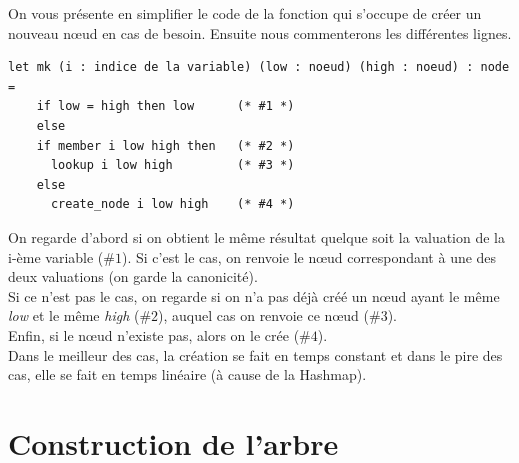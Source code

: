 \documentclass[a4paper, oneside]{report}
\begin{document}
On vous présente en simplifier le code de la fonction qui s'occupe de créer un nouveau nœud en cas de besoin. Ensuite nous commenterons les différentes lignes.
\begin{lstlisting}
let mk (i : indice de la variable) (low : noeud) (high : noeud) : node =
    if low = high then low      (* #1 *)
    else
    if member i low high then   (* #2 *)
      lookup i low high         (* #3 *)
    else
      create_node i low high    (* #4 *)
\end{lstlisting}
On regarde d'abord si on obtient le même résultat quelque soit la valuation de la i-ème variable ($\#1$). Si c'est le cas, on renvoie le nœud correspondant à une des deux valuations (on garde la canonicité).\\
Si ce n'est pas le cas, on regarde si on n'a pas déjà créé un nœud ayant le même \textit{low} et le même \textit{high} ($\#2$), auquel cas on renvoie ce nœud ($\#3$).\\
Enfin, si le nœud n'existe pas, alors on le crée ($\#4$).\\
Dans le meilleur des cas, la création se fait en temps constant et dans le pire des cas, elle se fait en temps linéaire (à cause de la Hashmap).

\section{Construction de l'arbre}
\end{document}
